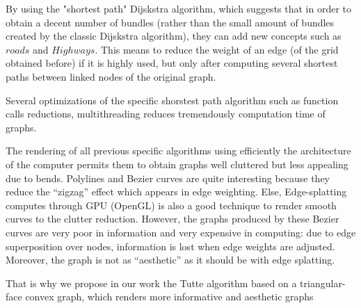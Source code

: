  By using the "shortest path" Dijskstra  algorithm, which suggests that in order to obtain a decent number of bundles (rather than the small amount of bundles created by the classic Dijskstra algorithm), they can add new concepts such as $roads$ and $Highways$. This means to reduce the weight of an edge (of the grid obtained before) if it is highly used, but only after computing several shortest paths between linked nodes of the original graph. 

  Several optimizations of the specific shorstest path algorithm such as function calls reductions, multithreading reduces tremendously computation time of graphs.

The rendering of all previous specific algorithms using efficiently the architecture of the computer permits them to obtain graphs well cluttered but less appealing due to bends. Polylines and Bezier curves are quite interesting because they reduce the “zigzag” effect which appears in edge weighting. Else, Edge-splatting computes through GPU (OpenGL) is also a good technique to render smooth curves to the clutter reduction. However, the graphs produced by these Bezier curves are very poor in information and very expensive in computing: due to edge superposition over nodes, information is lost when edge weights are adjusted. Moreover, the graph is not as “aesthetic” as it should be with edge splatting. 

That is why we propose in our work the Tutte algorithm based on a triangular-face convex graph, which renders more informative and aesthetic graphs
